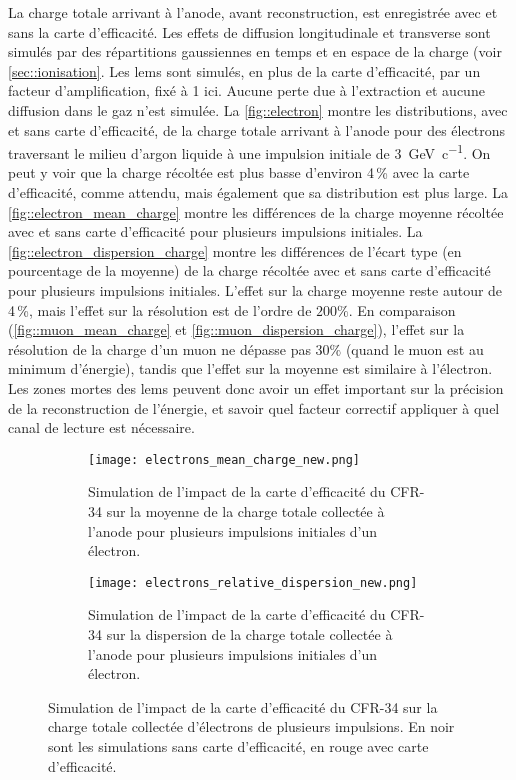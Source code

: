       La charge totale arrivant à l'anode, avant reconstruction, est enregistrée avec et sans la carte d'efficacité. Les effets de diffusion longitudinale et transverse sont simulés par des répartitions gaussiennes en temps et en espace de la charge (voir \autoref{sec::ionisation}. Les \glspl{lem} sont simulés, en plus de la carte d'efficacité, par un facteur d'amplification, fixé à 1 ici. Aucune perte due à l'extraction et aucune diffusion dans le gaz n'est simulée. La \autoref{fig::electron} montre les distributions, avec et sans carte d'efficacité, de la charge totale arrivant à l'anode pour des électrons traversant le milieu d'argon liquide à une impulsion initiale de \SI{3}{\giga\eV\per c}. On peut y voir que la charge récoltée est plus basse d'environ 4\,\% avec la carte d'efficacité, comme attendu, mais également que sa distribution est plus large. La \autoref{fig::electron_mean_charge} montre les différences de la charge moyenne récoltée avec et sans carte d'efficacité pour plusieurs impulsions initiales. La \autoref{fig::electron_dispersion_charge} montre les différences de l'écart type (en pourcentage de la moyenne) de la charge récoltée avec et sans carte d'efficacité pour plusieurs impulsions initiales. L'effet sur la charge moyenne reste autour de 4\,\%, mais l'effet sur la résolution est de l'ordre de $200\%$. En comparaison (\autoref{fig::muon_mean_charge} et \autoref{fig::muon_dispersion_charge}), l'effet sur la résolution de la charge d'un muon ne dépasse pas $30\%$ (quand le muon est au minimum d'énergie), tandis que l'effet sur la moyenne est similaire à l'électron. Les zones mortes des \glspl{lem} peuvent donc avoir un effet important sur la précision de la reconstruction de l'énergie, et savoir quel facteur correctif appliquer à quel canal de lecture est nécessaire.
            
      \begin{figure}[htbp]
        \begin{subfigure}[t]{0.48\textwidth}
          \centering
          \texttt{[image: electrons\_mean\_charge\_new.png]}
          \caption{\label{fig::electron_mean_charge}Simulation de l'impact de la carte d'efficacité du CFR-34 sur la moyenne de la charge totale collectée à l'anode pour plusieurs impulsions initiales d'un électron.}
        \end{subfigure}
        \hfill
        \begin{subfigure}[t]{0.48\textwidth}
          \centering
          \texttt{[image: electrons\_relative\_dispersion\_new.png]}
          \caption{\label{fig::electron_dispersion_charge}Simulation de l'impact de la carte d'efficacité du CFR-34 sur la dispersion de la charge totale collectée à l'anode pour plusieurs impulsions initiales d'un électron.}
        \end{subfigure}
        \caption[Simulation de l'impact de la carte d'efficacité du CFR-34 sur la charge totale collectée d'électrons de plusieurs impulsions]{Simulation de l'impact de la carte d'efficacité du CFR-34 sur la charge totale collectée d'électrons de plusieurs impulsions. En noir sont les simulations sans carte d'efficacité, en rouge avec carte d'efficacité.}
      \end{figure}
            
